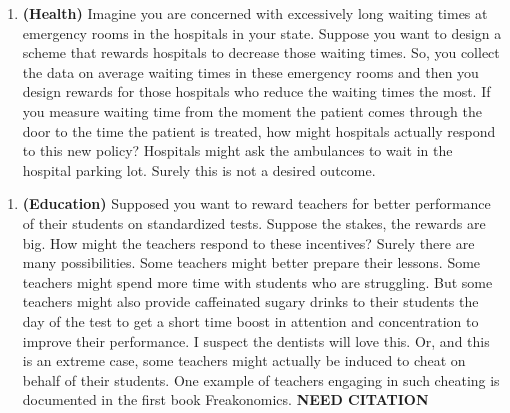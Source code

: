 \documentclass[
]{book}
\providecommand{\tightlist}{%
  \setlength{\itemsep}{0pt}\setlength{\parskip}{0pt}}
\begin{document}
\begin{enumerate}
\def\labelenumi{\arabic{enumi}.}
\setcounter{enumi}{3}
\tightlist
\item
  \textbf{(Health)} Imagine you are concerned with excessively long waiting times at emergency rooms in the hospitals in your state. Suppose you want to design a scheme that rewards hospitals to decrease those waiting times. So, you collect the data on average waiting times in these emergency rooms and then you design rewards for those hospitals who reduce the waiting times the most. If you measure waiting time from the moment the patient comes through the door to the time the patient is treated, how might hospitals actually respond to this new policy?
  Hospitals might ask the ambulances to wait in the hospital parking lot. Surely this is not a desired outcome.
\end{enumerate}

\begin{enumerate}
\def\labelenumi{\arabic{enumi}.}
\setcounter{enumi}{4}
\tightlist
\item
  \textbf{(Education)} Supposed you want to reward teachers for better performance of their students on standardized tests. Suppose the stakes, the rewards are big. How might the teachers respond to these incentives? Surely there are many possibilities.
  Some teachers might better prepare their lessons.
  Some teachers might spend more time with students who are struggling.
  But some teachers might also provide caffeinated sugary drinks to their students the day of the test to get a short time boost in attention and concentration to improve their performance. I suspect the dentists will love this.
  Or, and this is an extreme case, some teachers might actually be induced to cheat on behalf of their students. One example of teachers engaging in such cheating is documented in the first book Freakonomics. \textbf{NEED CITATION}
\end{enumerate}
\end{document}
